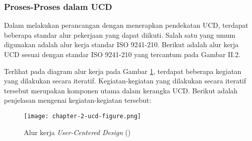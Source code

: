 \subsubsection{Proses-Proses dalam UCD}

Dalam melakukan perancangan dengan menerapkan pendekatan UCD, terdapat beberapa standar alur pekerjaan yang dapat diikuti. Salah satu yang umum digunakan adalah alur kerja standar ISO 9241-210. Berikut adalah alur kerja UCD sesuai dengan standar ISO 9241-210 yang tercantum pada Gambar II.2.

Terlihat pada diagram alur kerja pada Gambar \ref{fig:diagram_iso2}, terdapat beberapa kegiatan yang dilakukan secara iteratif. Kegiatan-kegiatan yang dilakukan secara iteratif tersebut merupakan komponen utama dalam kerangka UCD. Berikut adalah penjelasan mengenai kegiatan-kegiatan tersebut:

\begin{figure}[h]
  \centering
  \texttt{[image: chapter-2-ucd-figure.png]}
  \caption{Alur kerja \textit{User-Centered Design} (\parencite{iso9241-210:2010})}
  \label{fig:diagram_iso2}
\end{figure}
\FloatBarrier

